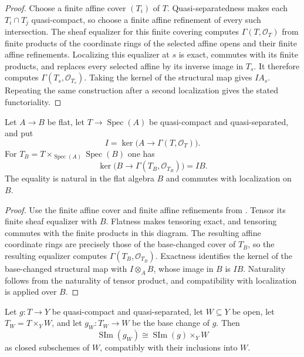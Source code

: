 \begin{proof}
  Choose a finite affine cover $(T_i)$ of $T$.  Quasi-separatedness makes
  each $T_i\cap T_j$ quasi-compact, so choose a finite affine refinement of
  every such intersection.  The sheaf equalizer for this finite covering
  computes $\Gamma(T,\mathcal O_T)$ from finite products of the coordinate
  rings of the selected affine opens and their finite affine refinements.
  Localizing this equalizer at $s$ is exact, commutes with its finite
  products, and replaces every selected affine by its inverse image in
  $T_s$.  It therefore computes $\Gamma(T_s,\mathcal O_{T_s})$.  Taking the
  kernel of the structural map gives $IA_s$.  Repeating the same construction
  after a second localization gives the stated functoriality.
\end{proof}

\begin{lemma}
  \label{lemma:nagata-affine-image-kernel-flat}

  Let $A\to B$ be flat, let $T\to\operatorname{Spec}(A)$ be quasi-compact
  and quasi-separated, and put
  \[
    I=\ker\bigl(A\longrightarrow\Gamma(T,\mathcal O_T)\bigr).
  \]
  For $T_B=T\times_{\operatorname{Spec}(A)}\operatorname{Spec}(B)$ one has
  \[
    \ker\bigl(B\longrightarrow\Gamma(T_B,\mathcal O_{T_B})\bigr)=IB.
  \]
  The equality is natural in the flat algebra $B$ and commutes with
  localization on $B$.
\end{lemma}

\begin{proof}
  Use the finite affine cover and finite affine refinements from
  .  Tensor its finite
  sheaf equalizer with $B$.  Flatness makes tensoring exact, and tensoring
  commutes with the finite products in this diagram.  The resulting affine
  coordinate rings are precisely those of the base-changed cover of $T_B$,
  so the resulting equalizer computes $\Gamma(T_B,\mathcal O_{T_B})$.
  Exactness identifies the kernel of the base-changed structural map with
  $I\otimes_A B$, whose image in $B$ is $IB$.  Naturality follows from the
  naturality of tensor product, and compatibility with localization is
   applied over $B$.
\end{proof}

\begin{lemma}
  \label{lemma:nagata-scheme-image-restrict-open}

  Let $g\colon T\to Y$ be quasi-compact and quasi-separated, let
  $W\subseteq Y$ be open, let $T_W=T\times_YW$, and let
  $g_W\colon T_W\to W$ be the base change of $g$.  Then
  \[
    \operatorname{SIm}(g_W)
      \cong\operatorname{SIm}(g)\times_YW
  \]
  as closed subschemes of $W$, compatibly with their inclusions into $W$.
\end{lemma}

